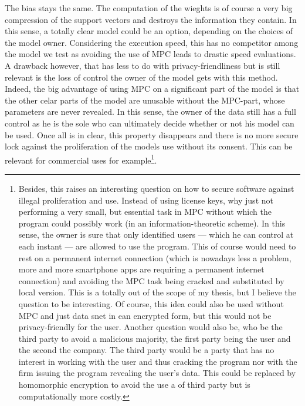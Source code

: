 \begin{itemize}
    The bias stays the same. The computation of the wieghts is of course a very big compression of the support vectors and destroys the information they contain. In this sense, a totally clear model could be an option, depending on the choices of the model owner. Considering the execution speed, this has no competitor among the model we test as avoiding the use of MPC leads to drastic speed evaluations. A drawback however, that has less to do with privacy-friendliness but is still relevant is the loss of control the owner of the model gets with this method. Indeed, the big advantage of using MPC on a significant part of the model is that the other celar parts of the model are unusable without the MPC-part, whose parameters are never revealed. In this sense, the owner of the data still has a full control as he is the sole who can ultimately decide whether or not his model can be used. Once all is in clear, this property disappears and there is no more secure lock against the proliferation of the models use without its consent. This can be relevant for commercial uses for example\footnote{Besides, this raises an interesting question on how to secure software against illegal proliferation and use. Instead of using license keys, why just not performing a very small, but essential task in MPC without which the program could possibly work (in an information-theoretic scheme). In this sense, the owner is sure that only identified users --- which he can control at each instant --- are allowed to use the program. This of course would need to rest on a permanent internet connection (which is nowadays less a problem, more and more smartphone apps are requiring a permanent internet connection) and avoiding the MPC task being cracked and substituted by local version. This is a totally out of the scope of my thesis, but I believe the question to be interesting. Of course, this idea could also be used without MPC and just data snet in ean encrypted form, but this would not be privacy-friendly for the user. Another question would also be, who be the third party to avoid a malicious majority, the first party being the user and the second the company. The third party would be a party that has no interest in working with the user and thus cracking the program nor with the firm issuing the program revealing the user's data. This could be replaced by homomorphic encryption to avoid the use a of third party but is computationally more  costly.}.
\end{itemize}

\FloatBarrier
